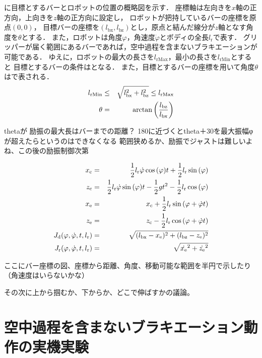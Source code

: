         に目標とするバーとロボットの位置の概略図を示す．
        座標軸は左向きを$x$軸の正方向，上向きを$z$軸の正方向に設定し，
        ロボットが把持しているバーの座標を原点$(0,0)$，
        目標バーの座標を$(l_{\mathrm{bx}},l_{\mathrm{bz}})$とし，原点と結んだ線分が$z$軸となす角度を$\theta$とする．
        また，ロボットは角度$\varphi$，角速度$\dot{\varphi}$とボディの全長$l_{\mathrm{r}}$で表す．
        グリッパーが届く範囲にあるバーであれば，空中過程を含まないブラキエーションが可能である．
        ゆえに，ロボットの最大の長さを$l_{\mathrm{rMax}}$，最小の長さを$l_{\mathrm{rMin}}$とすると
        目標とするバーの条件はとなる．
        また，目標とするバーの座標を用いて角度$\theta$はで表される．
        \begin{eqnarray}
                \equlabel{barRange}
                l_{\mathrm{rMin}} &\le& \sqrt{l_{\mathrm{bx}}^2+l_{\mathrm{bz}}^2} \le l_{\mathrm{rMax}}\\
                \equlabel{theta}
                \theta&=&\arctan{\left(\frac{l_{\mathrm{bz}}}{l_{\mathrm{bx}}}\right)}
                \end{eqnarray}  
        

        thetaが
        励振の最大長はバーまでの距離？
        180に近づくとtheta＋30を最大振幅φが超えたらというのはできなくなる
        範囲狭めるか、励振でジャストは難しいよね、この後の励振制御次第

        \begin{eqnarray}
                \equlabel{lr-range}
                x_{\mathrm{c}}&=&\frac{1}{2}l_{\mathrm{r}}\dot{\varphi}\cos{(\varphi)}t+\frac{1}{2}l_{\mathrm{r}}\sin{(\varphi)}\\
                \equlabel{bar}
                z_{\mathrm{c}}&=&\frac{1}{2}l_{\mathrm{r}}\dot{\varphi}\sin{(\varphi)}t-\frac{1}{2}gt^2-\frac{1}{2}l_{\mathrm{r}}\cos{(\varphi)}\\
                \equlabel{x-e}
                x_{\mathrm{e}}&=&x_{\mathrm{c}}+\frac{1}{2}l_{\mathrm{r}}\sin{(\varphi+\dot{\varphi}t)}\\
                \equlabel{z-e}
                z_{\mathrm{e}}&=&z_{\mathrm{c}}-\frac{1}{2}l_{\mathrm{r}}\cos{(\varphi+\dot{\varphi}t)}\\
                \equlabel{Jd}
                  J_{\mathrm{d}}(\varphi,\dot{\varphi},t,l_{\mathrm{r}})
                  &=&\sqrt{(l_{\mathrm{bx}}-x_{\mathrm{e}})^2+(l_{\mathrm{bz}}-z_{\mathrm{e}})^2}\\
                \equlabel{Jr}
                J_{\mathrm{r}}(\varphi,\dot{\varphi},t,l_{\mathrm{r}})
                &=&\sqrt{\dot{x_{\mathrm{e}}}^2+\dot{z_{\mathrm{e}}}^2}
              \end{eqnarray}  




        ここにバー座標の図、座標から距離、角度、移動可能な範囲を半円で示したり（角速度はいらないかな）

        その次に上から掴むか、下からか、どこで伸ばすかの議論。

        \section{空中過程を含まないブラキエーション動作の実機実験}


